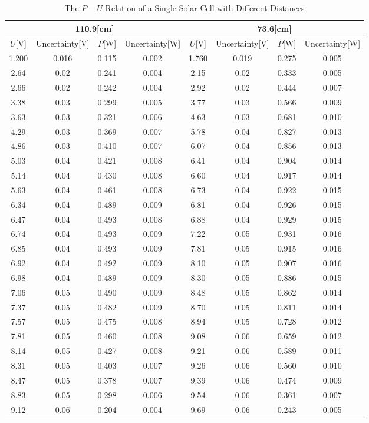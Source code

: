 \documentclass[a4paper]{article}
\begin{document}
    \begin{table}[H]
        \centering
        \begin{tabular}{|c|c|c|c||c|c|c|c|}
            \hline
            \multicolumn{4}{|c||}{110.9[cm]}&\multicolumn{4}{c|}{73.6[cm]}\\\hline
            $U$[V]&Uncertainty[V]&$P$[W]&Uncertainty[W]&$U$[V]&Uncertainty[V]&$P$[W]&Uncertainty[W]\\\hline
            1.200&0.016&0.115&0.002&1.760&0.019&0.275&0.005\\\hline
            2.64&0.02&0.241&0.004&2.15&0.02&0.333&0.005\\\hline
            2.66&0.02&0.242&0.004&2.92&0.02&0.444&0.007\\\hline
            3.38&0.03&0.299&0.005&3.77&0.03&0.566&0.009\\\hline
            3.63&0.03&0.321&0.006&4.63&0.03&0.681&0.010\\\hline
            4.29&0.03&0.369&0.007&5.78&0.04&0.827&0.013\\\hline
            4.86&0.03&0.410&0.007&6.07&0.04&0.856&0.013\\\hline
            5.03&0.04&0.421&0.008&6.41&0.04&0.904&0.014\\\hline
            5.14&0.04&0.430&0.008&6.60&0.04&0.917&0.014\\\hline
            5.63&0.04&0.461&0.008&6.73&0.04&0.922&0.015\\\hline
            6.34&0.04&0.489&0.009&6.81&0.04&0.926&0.015\\\hline
            6.47&0.04&0.493&0.008&6.88&0.04&0.929&0.015\\\hline
            6.74&0.04&0.493&0.009&7.22&0.05&0.931&0.016\\\hline
            6.85&0.04&0.493&0.009&7.81&0.05&0.915&0.016\\\hline
            6.92&0.04&0.492&0.009&8.10&0.05&0.907&0.016\\\hline
            6.98&0.04&0.489&0.009&8.30&0.05&0.886&0.015\\\hline
            7.06&0.05&0.490&0.009&8.48&0.05&0.862&0.014\\\hline
            7.37&0.05&0.482&0.009&8.70&0.05&0.811&0.014\\\hline
            7.57&0.05&0.475&0.008&8.94&0.05&0.728&0.012\\\hline
            7.81&0.05&0.460&0.008&9.08&0.06&0.659&0.012\\\hline
            8.14&0.05&0.427&0.008&9.21&0.06&0.589&0.011\\\hline
            8.31&0.05&0.403&0.007&9.26&0.06&0.560&0.010\\\hline
            8.47&0.05&0.378&0.007&9.39&0.06&0.474&0.009\\\hline
            8.83&0.05&0.298&0.006&9.54&0.06&0.361&0.007\\\hline
            9.12&0.06&0.204&0.004&9.69&0.06&0.243&0.005\\\hline
        \end{tabular}
        \caption{The $P-U$ Relation of a Single Solar Cell with Different Distances}
        \label{tab:PUsingle}
    \end{table}
\end{document}
